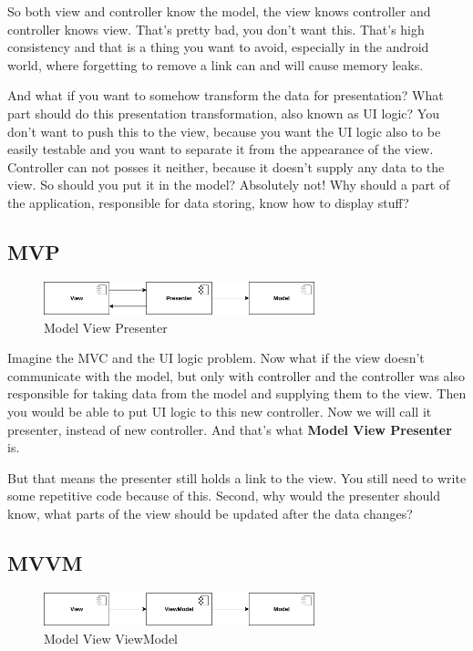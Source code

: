 So both view and controller know the model, the view knows controller and controller knows view.
That's pretty bad, you don't want this.
That's high consistency and that is a thing you want to avoid, especially in the android world, where forgetting to remove a link can and will cause memory leaks.

And what if you want to somehow transform the data for presentation?
What part should do this presentation transformation, also known as UI logic?
You don't want to push this to the view, because you want the UI logic also to be easily testable and you want to separate it from the appearance of the view.
Controller can not posses it neither, because it doesn't supply any data to the view. So should you put it in the model? Absolutely not!
Why should a part of the application, responsible for data storing, know how to display stuff?

\subsection{MVP}

\begin{figure}\centering
	\includegraphics[width=0.7\textwidth]{pics/patterns/bc-mvp.png}
	\caption[MVP]{Model View Presenter}\label{fig:mvp}
\end{figure}

Imagine the MVC and the UI logic problem.
Now what if the view doesn't communicate with the model, but only with controller and the controller was also responsible for taking data from the model and supplying them to the view.
Then you would be able to put UI logic to this new controller. Now we will call it presenter, instead of new controller.
And that's what \textbf{Model View Presenter} is.

But that means the presenter still holds a link to the view. You still need to write some repetitive code because of this.
Second, why would the presenter should know, what parts of the view should be updated after the data changes?

\subsection{MVVM}

\begin{figure}\centering
	\includegraphics[width=0.7\textwidth]{pics/patterns/bc-mvvm.png}
	\caption[MVVM]{Model View ViewModel}\label{fig:mvvm}
\end{figure}

